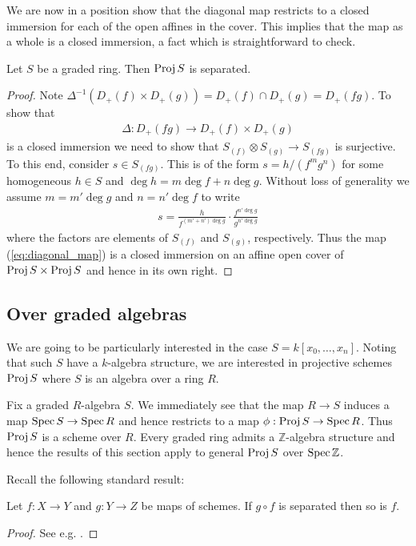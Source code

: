 \documentclass{article}
\begin{document}
We are now in a position show that the diagonal map restricts to a
closed immersion for each of the open affines in the cover. This
implies that the map as a whole is a closed immersion, a fact which
is straightforward to check.

\begin{theorem}\label{thm:separated}
  Let $S$ be a graded ring. Then $\operatorname{Proj} S$ is separated.
  \begin{proof}
    Note ${\Delta}^{-1}(D_+(f)\times D_+(g)) = D_+(f)\cap D_+(g) = D_+(fg)$.
    To show that
    \begin{align*}
      \Delta : D_+(fg) \to D_+(f)\times D_+(g)
    \end{align*}
    is a closed immersion we need to show that
    $S_{(f)}\otimes S_{(g)}\to S_{(fg)}$ is surjective. To this end,
    consider $s\in S_{(fg)}$. This is of the form
    $s=h/(f^m g^n)$ for some homogeneous $h\in S$ and
    $\deg h = m\deg f + n\deg g$. Without loss of generality we assume
    $m = m'\deg g$ and $n=n'\deg f$ to write
    \begin{align*}
      s = \frac{h}{f^{(m'+n')\deg g}} \cdot \frac{f^{n'\deg g}}{g^{n'\deg g}}
    \end{align*}
    where the factors are elements of $S_{(f)}$ and $S_{(g)}$,
    respectively. Thus the map (\ref{eq:diagonal_map}) is a closed
    immersion on an affine open cover of $\operatorname{Proj} S\times \operatorname{Proj} S$
    and hence in its own right.
  \end{proof}
\end{theorem}


\subsection{Over graded algebras}

We are going to be particularly interested in the case
$S = k[x_0,\ldots,x_n]$. Noting that such $S$ have a $k$-algebra
structure, we are interested in projective schemes $\operatorname{Proj} S$
where $S$ is an algebra over a ring $R$.

Fix a graded $R$-algebra $S$. We immediately
see that the map $R\to S$ induces a map $\operatorname{Spec} S\to\operatorname{Spec} R$ and
hence restricts to a map $\phi:\operatorname{Proj} S\to\operatorname{Spec} R$. Thus $\operatorname{Proj} S$ is a
scheme over $R$. Every graded ring admits a
$\mathbb{Z}$-algebra structure and hence the results of this
section apply to general $\operatorname{Proj} S$ over $\operatorname{Spec}\mathbb{Z}$.

Recall the following standard result:

\begin{lemma}\label{thm:composition_of_separted_maps}
  Let $f:X\to Y$ and $g:Y\to Z$ be maps of schemes. If $g\circ f$ is
  separated then so is $f$.
  \begin{proof}
    See e.g. {\cite[\href{https://stacks.math.columbia.edu/tag/01KV}{Tag 01KV}]{stacks-project}}.
  \end{proof}
\end{lemma}
\end{document}
